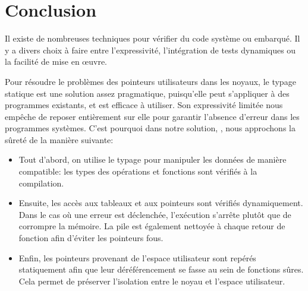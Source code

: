 \section*{Conclusion}

Il existe de nombreuses techniques pour vérifier du code système ou embarqué. Il
y a divers choix à faire entre l'expressivité, l'intégration de tests
dynamiques ou la facilité de mise en œuvre.

Pour résoudre le problèmes des pointeurs utilisateurs dans les noyaux, le typage
statique est une solution assez pragmatique, puisqu'elle peut s'appliquer à des
programmes existants, et est efficace à utiliser. Son expressivité limitée nous
empêche de reposer entièrement sur elle pour garantir l'absence d'erreur dans
les programmes systèmes. C'est pourquoi dans notre solution, \langname, nous
approchons la sûreté de la manière suivante:

\begin{itemize}
\item Tout d'abord, on utilise le typage pour manipuler les données de manière
      compatible: les types des opérations et fonctions sont vérifiés à la
      compilation.

\item Ensuite, les accès aux tableaux et aux pointeurs sont vérifiés
      dynamiquement. Dans le cas où une erreur est déclenchée, l'exécution
      s'arrête plutôt que de corrompre la mémoire. La pile est également
      nettoyée à chaque retour de fonction afin d'éviter les pointeurs fous.

\item Enfin, les pointeurs provenant de l'espace utilisateur sont repérés
      statiquement afin que leur déréférencement se fasse au sein de fonctions
      sûres. Cela permet de préserver l'isolation entre le noyau et l'espace
      utilisateur.
\end{itemize}

